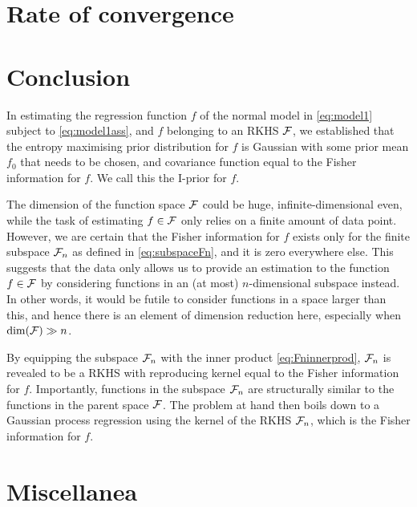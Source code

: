 \documentclass[a4paper,showframe,11pt,draft]{report}
\begin{document}
\section{Rate of convergence}

\section{Conclusion}

In estimating the regression function $f$ of the normal model in \eqref{eq:model1} subject to \eqref{eq:model1ass}, and $f$ belonging to an RKHS ${\mathcal F}$, we established that the entropy maximising prior distribution for $f$ is Gaussian with some prior mean $f_0$ that needs to be chosen, and covariance function equal to the Fisher information for $f$.
We call this the I-prior for $f$.

The dimension of the function space ${\mathcal F}$ could be huge, infinite-dimensional even, while the task of estimating $f\in{\mathcal F}$ only relies on a finite amount of data point.
However, we are certain that the Fisher information for $f$ exists only for the finite subspace ${\mathcal F}_n$ as defined in \eqref{eq:subspaceFn}, and it is zero everywhere else.
This suggests that the data only allows us to provide an estimation to the function $f\in{\mathcal F}$ by considering functions in an (at most) $n$-dimensional subspace instead.
In other words, it would be futile to consider functions in a space larger than this, and hence there is an element of dimension reduction here, especially when $\dim({\mathcal F}) \gg n$.

By equipping the subspace ${\mathcal F}_n$ with the inner product  \eqref{eq:Fninnerprod}, ${\mathcal F}_n$ is revealed to be a RKHS with reproducing kernel equal to the Fisher information for $f$.
Importantly, functions in the subspace ${\mathcal F}_n$ are structurally similar to the functions in the parent space ${\mathcal F}$.
The problem at hand then boils down to a Gaussian process regression using the kernel of the RKHS ${\mathcal F}_n$, which is the Fisher information for $f$.

\newpage
\section*{Miscellanea}


\hClosingStuffStandalone
\end{document}
